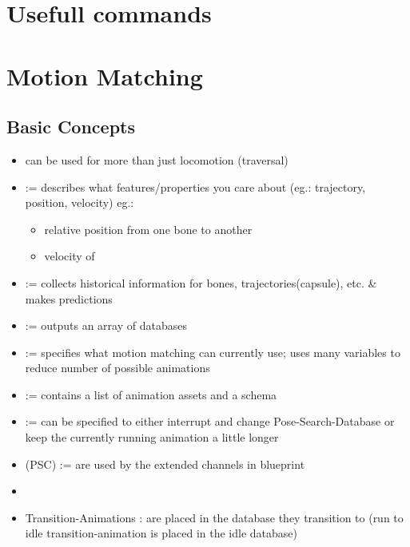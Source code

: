    \section{Usefull commands}


    \section{Motion Matching}

        \subsection{Basic Concepts}
            \begin{itemize}
                \item can be used for more than just locomotion (traversal)
                \item {} := describes what features/properties you care about (eg.: trajectory, position, velocity) eg.:
                \begin{itemize}
                    \item relative position from one bone to another
                    \item velocity of 
                \end{itemize}
                \item {} := collects historical information for bones, trajectories(capsule), etc. \& makes predictions
                \item {} := outputs an array of databases
                \item {} := specifies what motion matching can currently use; uses many variables to reduce number of possible animations
                \item {} := contains a list of animation assets and a schema
                \item {} := can be specified to either interrupt and change Pose-Search-Database or keep the currently running animation a little longer
                \item {} (PSC) := are used by the extended channels in blueprint %
                \item 
                \item Transition-Animations : are placed in the database they transition to (run to idle transition-animation is placed in the idle database)
            \end{itemize}

